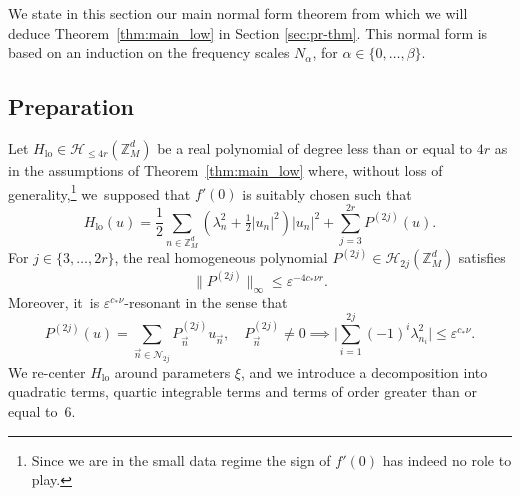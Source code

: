 \documentclass[10pt,a4paper]{amsart}
\theoremstyle{plain}
\theoremstyle{definition}
\DeclareMathOperator{\lo}{lo}
\newcommand{\Z}{\mathbb{Z}}
\newcommand{\1}{\mathbf{1}}
\let\epsilon\varepsilon
\begin{document}
We state in this section our main normal form theorem from which we will deduce Theorem~\ref{thm:main_low} in Section \ref{sec:pr-thm}. This normal form is based on an induction on the frequency scales $N_{\alpha}$, for $\alpha\in\{0,\dots,\beta\}$.

\subsection{Preparation} \label{sec:init}
Let $H_{\lo}\in\mathcal{H}_{\leq4r}(\Z_{M}^{d})$ be a real polynomial of degree less than or equal to $4r$ as in the assumptions of Theorem~\ref{thm:main_low} where, without loss of generality,\footnote{Since we are in the small data regime the sign of $f'(0)$ has indeed no role to play.} we~supposed that $f'(0)$ is suitably chosen such that
\begin{equation}
\label{eq:mars}
H_{\lo}(u) = \frac{1}{2}\sum_{n\in\Z_{M}^{d}} (\lambda_{n}^{2}+ \tfrac{1}{2}|u_{n}|^{2}) |u_{n}|^{2} + \sum_{j=3}^{2r}P^{(2j)}(u).
\end{equation}
For $j\in\{3,\dots,2r\}$, the real homogeneous polynomial $P^{(2j)}\in\mathcal{H}_{2j}(\Z_{M}^{d})$ satisfies
\begin{equation}
\label{eq:froid}
\|P^{(2j)}\|_{\infty} \leq \epsilon^{-4c_{\ast}\nu r}.
\end{equation}
Moreover, it~is $\epsilon^{c_{\ast}\nu}$-resonant in the sense that
\[
P^{(2j)}(u)
=
\sum_{\vec{n}\in\mathcal{N}_{2j}}
P^{(2j)}_{\vec{n}}u_{\vec{n}},
\quad P^{(2j)}_{\vec{n}}\neq0
\implies
\biggl|\sum_{i=1}^{2j}(-1)^{i}\lambda_{n_{i}}^{2}\biggl| \leq \epsilon^{c_{\ast}\nu}.
\]
We re-center $H_{\lo}$ around parameters $\xi$, and we introduce a decomposition into quadratic terms, quartic integrable terms and terms of order greater than or equal to~6.
\end{document}
